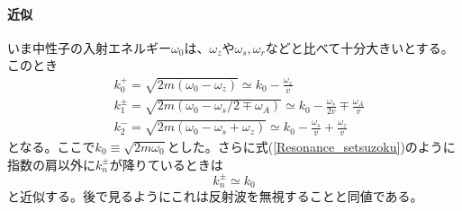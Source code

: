 \paragraph{近似}
いま中性子の入射エネルギー$\omega_0$は、$\omega_z$や$\omega_s,\omega_r$などと比べて十分大きいとする。このとき
\begin{align}
&k_0^+ =\sqrt{2m(\omega_0 -\omega_z)} \simeq k_0 -\frac{\omega_z}{v} \label{Resonance_k0+} \\
&k_1^{\pm} = \sqrt{2m(\omega_0-\omega_s/2 \mp \omega_A)} \simeq k_0 -\frac{\omega_s}{2v} \mp \frac{\omega_A}{v} \label{Resonance_k1+-} \\
&k_2^- =\sqrt{2m(\omega_0 -\omega_s +\omega_z)} \simeq k_0 -\frac{\omega_s}{v} +\frac{\omega_z}{v}\label{Resonance_k2-}
\end{align}
となる。ここで$k_0 \equiv \sqrt{2m\omega_0}$とした。さらに式(\ref{Resonance_setsuzoku})のように指数の肩以外に$k_n^\pm$が降りているときは
\begin{equation}
k_n^\pm \simeq k_0\label{Resonance_kn+-}
\end{equation}
と近似する。後で見るようにこれは反射波を無視することと同値である。

